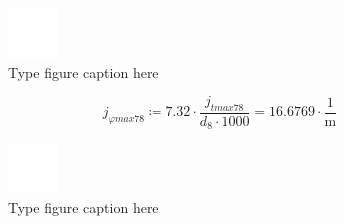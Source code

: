 \documentclass{article}
\newcommand{\defeq}{\coloneq} %
\begin{document}
\begin{figure}[h!]
 \begin{center}
  \includegraphics[max width=\textwidth]{calculations/886.png}
  \caption{Type figure caption here}
  \label{fig:886}
 \end{center}
\end{figure}
\begin{equation*}
\textit{j}_{\textit{φmax78}} \defeq 7.32 \cdot \frac{\textit{j}_{\textit{tmax78}}}{\textit{d}_{\textit{8}} \cdot 1000} = {16.6769 \cdot \frac{1}{\mathrm{m}}}
\end{equation*}
\begin{figure}[h!]
 \begin{center}
  \includegraphics[max width=\textwidth]{calculations/888.png}
  \caption{Type figure caption here}
  \label{fig:888}
 \end{center}
\end{figure}
\end{document}
